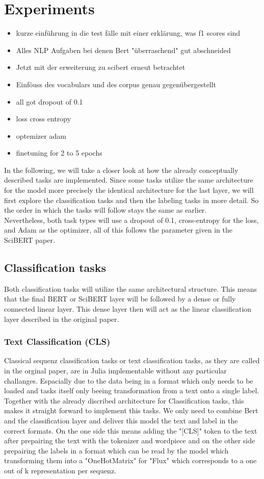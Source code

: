 \chapter{Experiments}
\begin{itemize}
	\item kurze einführung in die test fälle mit einer erklärung, was f1 scores sind
	\item Alles NLP Aufgaben bei denen Bert "überraschend" gut abschneided
	\item Jetzt mit der erweiterung zu scibert erneut betrachtet
	\item Einföuss des vocabulars und des corpus genau gegenübergestellt
	\item all got dropout of 0.1
	\item loss cross entropy
	\item optemizer adam
	\item finetuning for 2 to 5 epochs 
\end{itemize}
In the following, we will take a closer look at how the already conceptually described tasks are implemented. Since some tasks utilize the same architecture for the model more precisely the identical architecture for the last layer, we will first explore the classification tasks and then the labeling tasks in more detail. So the order in which the tasks will follow stays the same as earlier.\\
Nevertheless, both task types will use a dropout of 0.1, cross-entropy for the loss, and Adam as the optimizer, all of this follows the parameter given in the SciBERT paper.

\section{Classification tasks}
Both classification tasks will utilize the same architectural structure. This means that the final BERT or SciBERT layer will be followed by a dense or fully connected linear layer. This dense layer then will act as the linear classification layer described in the original paper. 
\subsection{Text Classification (CLS)}
Classical sequenz classification tasks or text classification tasks, as they are called in the orginal paper, are in Julia implementable without any particular challanges. Espacially due to the data being in a format which only needs to be loaded and tasks itself only beeing transformation from a text onto a single label. Together with the already discribed architecture for Classification tasks, this makes it straight forward to implement this tasks. We only need to combine Bert and the classification layer and deliver this model the text and label in the correct formats. On the one side this means adding the "[CLS]" token to the text after prepairing the text with the tokenizer and wordpiece and on the other side prepairing the labels in a format which can be read by the model which transforming them into a "OneHotMatrix" for "Flux" which corresponds to a one out of k representation per sequenz.
